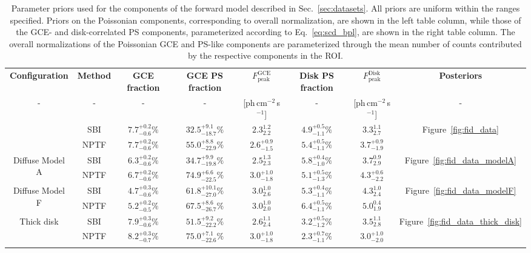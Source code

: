\documentclass[prd,aps,10pt,nofootinbib,twocolumn,superscriptaddress,preprintnumbers,balancelastpage,longbibliography]{revtex4-1}
\newcommand\Tstrut{\rule{0pt}{2.6ex}}         %
\newcommand\Bstrut{\rule[-0.9ex]{0pt}{0pt}}   %
\begin{document}
%
\begin{table}[!t]
    \small
    \begin{center}
    \begin{tabular}{cc|cccccc}
    \toprule
    \textbf{Configuration}  & \textbf{Method}  & \textbf{GCE fraction}	 & \textbf{GCE PS fraction}  & $F_{\mathrm{peak}}^\mathrm{GCE}$	&  \textbf{Disk PS fraction} &  $F_{\mathrm{peak}}^\mathrm{Disk}$	&  \textbf{Posteriors}\Tstrut\Bstrut	\\   
    - & - & - & - & [ph\,cm$^{-2}$\,s$^{-1}$] & - & [ph\,cm$^{-2}$\,s$^{-1}$]	& -\Tstrut\Bstrut	\\   
    \Xhline{1\arrayrulewidth}
    \multirow{2}{*}{Baseline} & SBI & $7.7^{+0.2}_{-0.6}\%$ & $32.5^{+9.1}_{-18.7}\%$ & $2.3^{1.2}_{2.2}$ & $4.9^{+0.5}_{-1.1}\%$ & $3.3^{1.1}_{2.7}$ & \multirow{2}{*}{Figure~\ref{fig:fid_data}}\Tstrut \\
    & NPTF & $7.7^{+0.2}_{-0.6}\%$ & $55.0^{+8.8}_{-22.9}\%$ &  $2.6^{+0.9}_{-1.5}$ & $5.4^{+0.5}_{-1.1}\%$ & $3.7^{+0.9}_{-1.9}$\Bstrut &\\ 
    \hline
    \multirow{2}{*}{Diffuse Model A} & SBI & $6.3^{+0.2}_{-0.6}\%$ & $34.7^{+9.9}_{-19.8}\%$ & $2.5^{1.3}_{2.3}$ & $5.8^{+0.4}_{-1.0}\%$ & $3.7^{0.9}_{2.9}$ & \multirow{2}{*}{Figure~\ref{fig:fid_data_modelA}}\Tstrut  \\ 
    & NPTF & $6.7^{+0.2}_{-0.6}\%$ & $74.9^{+6.6}_{-22.5}\%$ & $3.0^{+1.0}_{-1.8}$ &  $5.1^{+0.5}_{-1.3}\%$ & $4.3^{+0.6}_{-2.2}$\Bstrut &\\
    \hline
    \multirow{2}{*}{Diffuse Model F} & SBI & $4.7^{+0.3}_{-0.6}\%$ & $61.8^{+10.1}_{-27.0}\%$ & $3.0^{1.0}_{2.6}$ & $5.3^{+0.4}_{-1.1}\%$ & $4.3^{1.0}_{2.4}$
    & \multirow{2}{*}{Figure~\ref{fig:fid_data_modelF}}\Tstrut \\
    & NPTF & $5.2^{+0.2}_{-0.5}\%$ & $67.5^{+8.6}_{-26.7}\%$ & $3.0^{1.0}_{2.0}$ & $6.4^{+0.5}_{-1.1}\%$ & $5.0^{0.4}_{1.9}$\Bstrut &\\
    \hline
    \multirow{2}{*}{Thick disk} & SBI & $7.9^{+0.3}_{-0.6}\%$ & $51.5^{+9.2}_{-22.2}\%$ & $2.6^{1.1}_{2.4}$ & $3.2^{+0.5}_{-1.2}\%$ & $3.5^{1.1}_{2.8}$ & \multirow{2}{*}{Figure~\ref{fig:fid_data_thick_disk}}\Tstrut \\
    & NPTF & $8.2^{+0.3}_{-0.7}\%$ & $75.0^{+7.1}_{-22.6}\%$ & $3.0^{+1.0}_{-1.8}$ & $2.3^{+0.7}_{-1.1}\%$ & $3.0^{+1.0}_{-2.0}$\Bstrut &\\
    \botrule
    \end{tabular}
    \end{center}
    \caption{Parameter priors used for the components of the forward model described in Sec.~\ref{sec:datasets}. All priors are uniform within the ranges specified. Priors on the Poissonian components, corresponding to overall normalization, are shown in the left table column, while those of the GCE- and disk-correlated PS components, parameterized according to Eq.~\eqref{eq:scd_bpl}, are shown in the right table column. The overall normalizations of the Poissonian GCE and PS-like components are parameterized through the mean number of counts contributed by the respective components in the ROI.}
    \label{tab:results}
    \end{table}    
\end{document}
